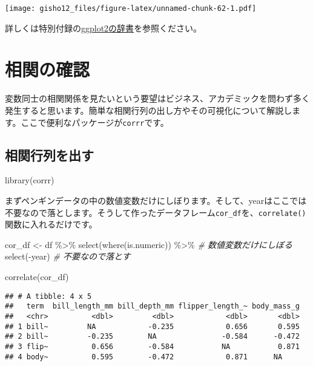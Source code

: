 \documentclass[
  xelatex,ja=standard, b5paper]{bxjsbook}
\newenvironment{Shaded}{\begin{snugshade}}{\end{snugshade}}
\newcommand{\CommentTok}[1]{\textcolor[rgb]{0.56,0.35,0.01}{\textit{#1}}}
\newcommand{\FunctionTok}[1]{\textcolor[rgb]{0.00,0.00,0.00}{#1}}
\newcommand{\NormalTok}[1]{#1}
\newcommand{\OtherTok}[1]{\textcolor[rgb]{0.56,0.35,0.01}{#1}}
\newcommand{\SpecialCharTok}[1]{\textcolor[rgb]{0.00,0.00,0.00}{#1}}
\begin{document}
\texttt{[image: gisho12\_files/figure-latex/unnamed-chunk-62-1.pdf]}

詳しくは特別付録の\href{https://izunyan.github.io/practice_ggplot2/}{ggplot2の辞書}を参照ください。

\hypertarget{ux76f8ux95a2ux306eux78baux8a8d}{%
\section{相関の確認}\label{ux76f8ux95a2ux306eux78baux8a8d}}

変数同士の相関関係を見たいという要望はビジネス、アカデミックを問わず多く発生すると思います。簡単な相関行列の出し方やその可視化について解説します。ここで便利なパッケージが\texttt{corrr}です。

\hypertarget{ux76f8ux95a2ux884cux5217ux3092ux51faux3059}{%
\subsection{相関行列を出す}\label{ux76f8ux95a2ux884cux5217ux3092ux51faux3059}}

\begin{Shaded}
\begin{Highlighting}[]
\FunctionTok{library}\NormalTok{(corrr)}
\end{Highlighting}
\end{Shaded}

まずペンギンデータの中の数値変数だけにしぼります。そして、yearはここでは不要なので落とします。そうして作ったデータフレーム\texttt{cor\_df}を、\texttt{correlate()}関数に入れるだけです。

\begin{Shaded}
\begin{Highlighting}[]
\NormalTok{cor\_df }\OtherTok{\textless{}{-}} 
\NormalTok{df }\SpecialCharTok{\%\textgreater{}\%} 
  \FunctionTok{select}\NormalTok{(}\FunctionTok{where}\NormalTok{(is.numeric)) }\SpecialCharTok{\%\textgreater{}\%} \CommentTok{\# 数値変数だけにしぼる}
  \FunctionTok{select}\NormalTok{(}\SpecialCharTok{{-}}\NormalTok{year)                 }\CommentTok{\# 不要なので落とす  }


\FunctionTok{correlate}\NormalTok{(cor\_df)}
\end{Highlighting}
\end{Shaded}

\begin{verbatim}
## # A tibble: 4 x 5
##   term  bill_length_mm bill_depth_mm flipper_length_~ body_mass_g
##   <chr>          <dbl>         <dbl>            <dbl>       <dbl>
## 1 bill~         NA            -0.235            0.656       0.595
## 2 bill~         -0.235        NA               -0.584      -0.472
## 3 flip~          0.656        -0.584           NA           0.871
## 4 body~          0.595        -0.472            0.871      NA
\end{verbatim}
\end{document}
